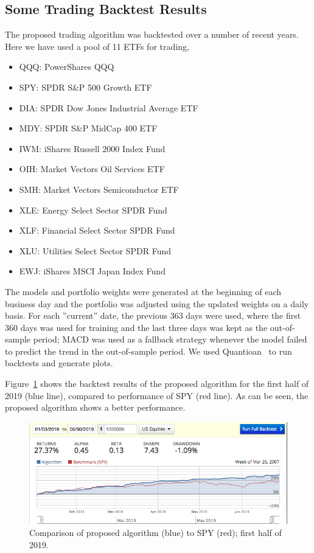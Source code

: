 \documentclass{article}
\begin{document}
\begin{case}
\subsection{Some Trading Backtest Results}\label{subsection:trading-backtest}

The proposed trading algorithm was backtested over a number of recent
years. Here we have used a pool of 11 ETFs for trading,

\begin{itemize}
    \item[] QQQ: PowerShares QQQ 
    \item[] SPY: SPDR S\&P 500 Growth ETF 
    \item[] DIA: SPDR Dow Jones Industrial Average ETF 
    \item[] MDY: SPDR S\&P MidCap 400 ETF 
    \item[] IWM: iShares Russell 2000 Index Fund 
    \item[] OIH: Market Vectors Oil Services ETF 
    \item[] SMH: Market Vectors Semiconductor ETF 
    \item[] XLE: Energy Select Sector SPDR Fund 
    \item[] XLF: Financial Select Sector SPDR Fund 
    \item[] XLU: Utilities Select Sector SPDR Fund 
    \item[] EWJ: iShares MSCI Japan Index Fund
\end{itemize}

The models and portfolio weights were generated at the beginning of
each business day and the portfolio was adjusted using the updated
weights on a daily basis. For each ''current'' date, the previous 363
days were used, where the first 360 days was used for training and the
last three days was kept as the out-of-sample period; MACD was used as
a fallback strategy whenever the model failed to predict the trend in
the out-of-sample period. We used Quantioan~\cite{ref:quantopian} to
run backtests and generate plots.

Figure~\ref{fig:backtest-2019-half} shows the backtest results of the
proposed algorithm for the first half of 2019 (blue line), compared to
performance of SPY (red line). As can be seen, the proposed algorithm
shows a better performance.

\begin{figure}\label{fig:backtest-2019-half}
\includegraphics[bb=0 0 640 480]{figures/2019_half_mfd_macd.png}
\caption{Comparison of proposed algorithm (blue) to SPY (red); first half of 2019.}  
\end{figure}


\end{case}
\end{document}
